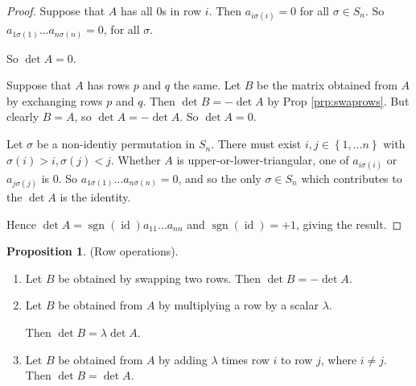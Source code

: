 \documentclass{article}
\theoremstyle{definition}
\newtheorem{proposition}[theorem]{Proposition}
\DeclareMathOperator{\sgn}{sgn}
\DeclareMathOperator{\id}{id}
\begin{document}
  \begin{proof}
    Suppose that $A$ has all $0$s in row $i$. Then $a_{i\sigma(i)}=0$ for all $\sigma \in S_{n}$. So $a_{1\sigma(1)}\dots a_{n\sigma(n)}=0$, for all $\sigma$.

    So $\det A = 0$.

    Suppose that $A$ has rows $p$ and $q$ the same. Let $B$ be the matrix obtained from $A$ by exchanging rows $p$ and $q$. Then $\det B=-\det A$ by Prop \ref{prp:swaprows}.  But clearly $B=A$, so $\det A = - \det A$. So $\det A=0$.

    Let $\sigma$ be a non-identiy permutation in $S_n$. There must exist $i,j \in \left\{ 1,\dots n \right\}$ with $\sigma(i) > i, \sigma(j)<j$. Whether $A$ is upper-or-lower-triangular, one of $a_{i\sigma(i)}$ or $a_{j\sigma(j)}$ is 0. So $a_{1\sigma(1)}\dots a_{n\sigma(n)}=0$, and so the only $\sigma \in S_n$ which contributes to the $\det A$ is the identity.

    Hence $\det A = \sgn(\id)a_{11}\dots a_{nn}$ and $\sgn(\id)=+1$, giving the result. 

  \end{proof}
    \begin{proposition}
      (Row operations).
      \begin{enumerate}
        \item Let $B$ be obtained by swapping two rows. Then $\det B=-\det A$.
        \item Let $B$ be obtained from $A$ by multiplying a row by a scalar $\lambda$.

          Then $\det B = \lambda \det A$.
        \item Let $B$ be obtained from $A$ by adding $\lambda$ times row $i$ to row $j$, where $i \neq j$. 
          Then $\det B = \det A$.
      \end{enumerate}
     \end{proposition}
\end{document}
